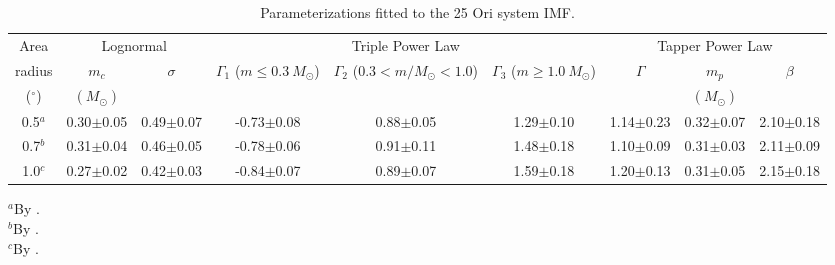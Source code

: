 \documentclass[12pt]{article}
\begin{document}
\begin{table}
\caption{Parameterizations fitted to the 25 Ori system IMF.}
  \scriptsize
  \label{tab_IMF:imf}
  \setlength{\tabcolsep}{5pt}
  \begin{threeparttable}
 	\begin{tabular}{@{\extracolsep{2pt}}ccccccccc@{}}
    \toprule
		Area           & \multicolumn{2}{c}{Lognormal} & \multicolumn{3}{c}{Triple Power Law}           & \multicolumn{3}{c}{Tapper Power Law} \\
   \cline{2-3}
   \cline{4-6}
   \cline{7-9}
        radius	    & $m_c$        & $\sigma$       & $\Gamma_1$ ($m\le0.3\ M_\odot$) & $\Gamma_2$ ($0.3<m/M_\odot<1.0$)  & $\Gamma_3$ ($m\ge1.0\ M_\odot$)  & $\Gamma$      & $m_p$         & $\beta$      \\
        ($^\circ$)  & $(M_\odot)$  &                &                               &                &               &               & $(M_\odot)$   &             \\
    \midrule
		0.5$^a$       & 0.30$\pm$0.05 & 0.49$\pm$0.07 & -0.73$\pm$0.08 & 0.88$\pm$0.05 & 1.29$\pm$0.10 & 1.14$\pm$0.23 & 0.32$\pm$0.07 & 2.10$\pm$0.18 \\
		0.7$^b$       & 0.31$\pm$0.04 & 0.46$\pm$0.05 & -0.78$\pm$0.06 & 0.91$\pm$0.11 & 1.48$\pm$0.18 & 1.10$\pm$0.09 & 0.31$\pm$0.03 & 2.11$\pm$0.09 \\
		1.0$^c$       & 0.27$\pm$0.02 & 0.42$\pm$0.03 & -0.84$\pm$0.07 & 0.89$\pm$0.07 & 1.59$\pm$0.18 & 1.20$\pm$0.13 & 0.31$\pm$0.05 & 2.15$\pm$0.18 \\
    \bottomrule
 	\end{tabular}
  \begin{tablenotes}
	$^a$By \citet{Downes2014}.\\
	$^b$By \citet{Briceno2005,Briceno2007}.\\
	$^c$By \citet{Briceno2018}.
  \end{tablenotes}
 \end{threeparttable}
\end{table}
\end{document}

